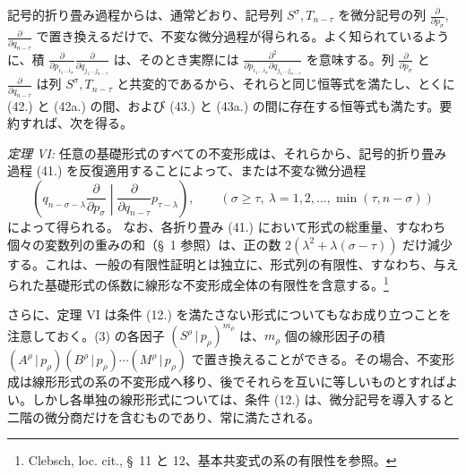 \documentclass[11pt]{article}
\newcommand{\pair}[2]{(#1\,|\,#2)}
\begin{document}
記号的折り畳み過程からは、通常どおり、記号列 $S^\sigma,T_{n-\tau}$ を微分記号の列 $\frac{\partial}{\partial p_\sigma}$, $\frac{\partial}{\partial q_{n-\tau}}$ で置き換えるだけで、不変な微分過程が得られる。よく知られているように、積 $\frac{\partial}{\partial p_{i_1\ldots i_\sigma}}\frac{\partial}{\partial q_{j_1\ldots j_{n-\tau}}}$ は、そのとき実際には $\frac{\partial^2}{\partial p_{i_1\ldots i_\sigma}\partial q_{j_1\ldots j_{n-\tau}}}$ を意味する。列 $\frac{\partial}{\partial p_\sigma}$ と $\frac{\partial}{\partial q_{n-\tau}}$ は列 $S^\sigma,T_{n-\tau}$ と共変的であるから、それらと同じ恒等式を満たし、とくに (42.) と (42a.) の間、および (43.) と (43a.) の間に存在する恒等式も満たす。要約すれば、次を得る。

\emph{定理 VI:} 任意の基礎形式のすべての不変形成は、それらから、記号的折り畳み過程 (41.) を反復適用することによって、または不変な微分過程
\begin{equation}
 \left(q_{n-\sigma-\lambda}\frac{\partial}{\partial p_\sigma}\middle|\frac{\partial}{\partial q_{n-\tau}}p_{\tau-\lambda}\right),
 \qquad(\sigma\ge\tau,\ \lambda=1,2,\ldots,\min(\tau,n-\sigma))
\tag{45}
\end{equation}
によって得られる。
なお、各折り畳み (41.) において形式の総重量、すなわち個々の変数列の重みの和（\S\ 1 参照）は、正の数 $2(\lambda^2+\lambda(\sigma-\tau))$ だけ減少する。これは、一般の有限性証明とは独立に、形式列の有限性、すなわち、与えられた基礎形式の係数に線形な不変形成全体の有限性を含意する。\footnote{Clebsch, loc. cit., \S\ 11 と 12、基本共変式の系の有限性を参照。}

さらに、定理 VI は条件 (12.) を満たさない形式についてもなお成り立つことを注意しておく。(3) の各因子 $\pair{S^\rho}{p_\rho}^{m_\rho}$ は、$m_\rho$ 個の線形因子の積 $\pair{A^\rho}{p_\rho}\pair{B^\rho}{p_\rho}\cdots\pair{M^\rho}{p_\rho}$ で置き換えることができる。その場合、不変形成は線形形式の系の不変形成へ移り、後でそれらを互いに等しいものとすればよい。しかし各単独の線形形式については、条件 (12.) は、微分記号を導入すると二階の微分商だけを含むものであり、常に満たされる。
\end{document}
